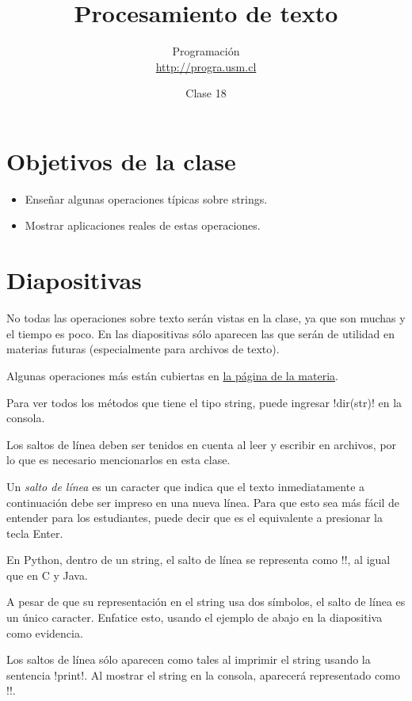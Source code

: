 \documentclass[10pt]{article}
\title{Procesamiento de texto}
\author{Programación \\ \url{http://progra.usm.cl}}
\date{Clase 18}
\begin{document}
  \maketitle

  \section*{Objetivos de la clase}
  \begin{itemize}
    \item Enseñar algunas operaciones típicas
      sobre strings.
    \item Mostrar aplicaciones reales de estas operaciones.
  \end{itemize}

  \section*{Diapositivas}

  No todas las operaciones sobre texto
  serán vistas en la clase,
  ya que son muchas y el tiempo es poco.
  En las diapositivas sólo aparecen
  las que serán de utilidad en materias futuras
  (especialmente para archivos de texto).

  Algunas operaciones más
  están cubiertas en \href{http://progra.usm.cl/materia/texto.html}{la página de la materia}.

  Para ver todos los métodos que tiene el tipo string,
  puede ingresar \li!dir(str)! en la consola.


  Los saltos de línea deben ser tenidos en cuenta
  al leer y escribir en archivos,
  por lo que es necesario mencionarlos en esta clase.

  Un \emph{salto de línea}
  es un caracter que indica que el texto inmediatamente a continuación
  debe ser impreso en una nueva línea.
  Para que esto sea más fácil de entender para los estudiantes,
  puede decir que es el equivalente a presionar la tecla Enter.

  En Python, dentro de un string, el salto de línea se representa
  como \li!\n!, al igual que en C y Java.

  A pesar de que su representación en el string usa dos símbolos,
  el salto de línea es un único caracter.
  Enfatice esto,
  usando el ejemplo de abajo en la diapositiva como evidencia.

  Los saltos de línea sólo aparecen como tales
  al imprimir el string usando la sentencia \li!print!.
  Al mostrar el string en la consola,
  aparecerá representado como \li!\n!.
\end{document}
